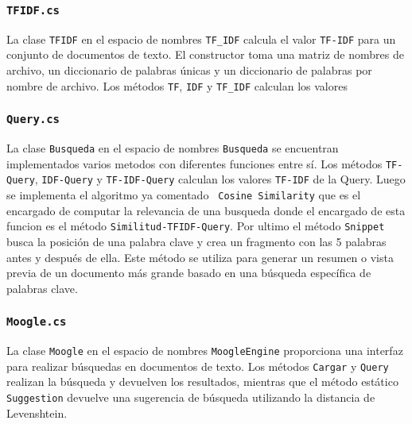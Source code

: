 \documentclass[a4paper, 12pt]{report}
\begin{document}
\subsubsection*{\tt TFIDF.cs}

 La clase \texttt{TFIDF} en el espacio de nombres \texttt{TF\_IDF} calcula el valor \texttt{TF-IDF} para un conjunto de documentos de texto.
 El constructor toma una matriz de nombres de archivo, un diccionario de palabras únicas y un diccionario de palabras por nombre de archivo.
 Los métodos \texttt{TF}, \texttt{IDF} y \texttt{TF\_IDF} calculan los valores

\subsubsection*{\tt Query.cs}

La clase \texttt{Busqueda} en el espacio de nombres \texttt{Busqueda} se encuentran implementados varios metodos con diferentes funciones entre sí.
Los métodos \texttt{TF-Query}, \texttt{IDF-Query} y \texttt{TF-IDF-Query} calculan los valores \texttt{TF-IDF} de la Query. 
Luego se implementa el algoritmo ya comentado \texttt { Cosine Similarity} que es el encargado de computar la relevancia de una busqueda  donde el encargado de esta funcion es el método \texttt {Similitud-TFIDF-Query}.
Por ultimo el método \texttt{Snippet} busca la posición de una palabra clave y crea un fragmento con las 5 palabras antes y después de ella. Este método se utiliza para generar un resumen o vista previa de un documento más grande basado en una búsqueda específica de palabras clave.

\subsubsection*{\tt Moogle.cs}

 La clase \texttt{Moogle} en el espacio de nombres \texttt{MoogleEngine} proporciona una interfaz para realizar búsquedas en documentos de texto.
 Los métodos \texttt{Cargar} y \texttt{Query} realizan la búsqueda y devuelven los resultados, mientras que el método estático \texttt{Suggestion} devuelve una sugerencia de búsqueda utilizando la distancia de Levenshtein.
\end{document}

